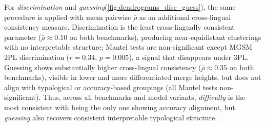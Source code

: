\documentclass[11pt]{article}
\begin{document}
For \textit{discrimination} and \textit{guessing}(\autoref{fig:dendrograms_disc_guess}),
the same procedure is applied with mean pairwise $\bar{\rho}$ as an additional
cross-lingual consistency measure. Discrimination is the least cross-lingually
consistent parameter ($\bar{\rho} \approx 0.10$ on both benchmarks), producing
near-equidistant clusterings with no interpretable structure; Mantel tests are
non-significant except MGSM 2PL discrimination ($r = 0.34$, $p = 0.005$), a signal
that disappears under 3PL. Guessing shows substantially higher cross-lingual
consistency ($\bar{\rho} \approx 0.35$ on both benchmarks), visible in lower and more
differentiated merge heights, but does not align with typological or accuracy-based
groupings (all Mantel tests non-significant). Thus, across all benchmarks and model
variants, \textit{difficulty} is the most consistent with being the only one showing accuracy alignment, but \textit{guessing} also recovers consistent interpretable
typological structure.

\end{document}
